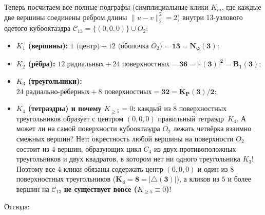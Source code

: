 Теперь посчитаем все полные подграфы (симплициальные клики $K_m$, где каждые две вершины соединены ребром длины $\|u-v\|_2^2 = 2$) внутри 13-узлового одетого кубооктаэдра $\mathcal{C}_{13} = \{(0,0,0)\}\cup O_2$:
\begin{itemize}[noitemsep]
\item \textbf{$K_1$ (вершины):} $1\text{ (центр)} + 12\text{ (оболочка }O_2\text{)} = \mathbf{13 = N_\varphi(3)}$;
\item \textbf{$K_2$ (рёбра):} $12\text{ радиальных} + 24\text{ поверхностных} = \mathbf{36 = |\square(3)|^2 = B_1(3)}$;
\item \textbf{$K_3$ (треугольники):} $24\text{ радиально-рёберных} + 8\text{ поверхностных} = \mathbf{32 = K_P(3)/2}$;
\item \textbf{$K_4$ (тетраэдры) и почему $K_{\ge 5} = 0$:} каждый из 8 поверхностных треугольников образует с центром $(0,0,0)$ правильный тетраэдр~$K_4$. А может ли на самой поверхности кубооктаэдра $O_2$ лежать четвёрка взаимно смежных вершин? Нет: окрестность любой вершины на поверхности $O_2$ состоит из $4$ вершин, образующих цикл $C_4$ из двух противоположных треугольников и двух квадратов, в котором нет ни одного треугольника $K_3$! Поэтому все 4-клики обязаны содержать центр $(0,0,0)$ и один из $8$ поверхностных треугольников ($\mathbf{K_4 = 8 = |{\triangle}(3)|}$), а кликов из $5$ и более вершин на $\mathcal{C}_{13}$ \textbf{не существует вовсе ($K_{\ge 5} \equiv 0$)}!
\end{itemize}
Отсюда:

